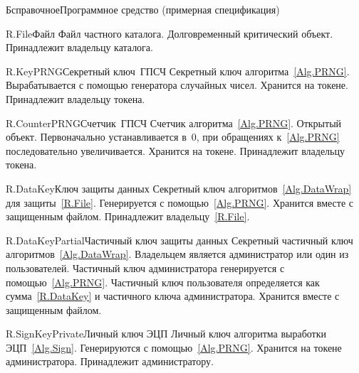 \begin{appendix}{Б}{справочное}{Программное средство \CryptoDisk 
(примерная спецификация)}
\begin{definition}{R.File}{Файл}
Файл частного каталога.
Долговременный критический объект.
Принадлежит владельцу каталога.
\end{definition}

\begin{definition}{R.KeyPRNG}{Секретный ключ~ГПСЧ}
Секретный ключ алгоритма~\ref{Alg.PRNG}.
Вырабатывается с помощью генератора случайных чисел.
Хранится на токене. Принадлежит владельцу токена.
\end{definition}

\begin{definition}{R.CounterPRNG}{Счетчик~ГПСЧ}
Счетчик алгоритма~\ref{Alg.PRNG}. Открытый объект.
Первоначально устанавливается в~$0$, при обращениях к~\ref{Alg.PRNG}
последовательно увеличивается. Хранится на токене. 
Принадлежит владельцу токена.
\end{definition}


\begin{definition}{R.DataKey}{Ключ защиты данных}
Секретный ключ алгоритмов~\ref{Alg.DataWrap} для защиты~\ref{R.File}.
Генерируется с помощью~\ref{Alg.PRNG}.
Хранится вместе с защищенным файлом. 
Принадлежит владельцу~\ref{R.File}.
\end{definition}

\begin{definition}{R.DataKeyPartial}{Частичный ключ защиты данных}
Секретный частичный ключ алгоритмов~\ref{Alg.DataWrap}.
Владельцем является администратор или один из пользователей.
Частичный ключ администратора генерируется с помощью~\ref{Alg.PRNG}.
Частичный ключ пользователя определяется как сумма~\ref{R.DataKey} 
и частичного ключа администратора. 
Хранится вместе с защищенным файлом. 
\end{definition}

\begin{definition}{R.SignKeyPrivate}{Личный ключ ЭЦП}
Личный ключ алгоритма выработки ЭЦП~\ref{Alg.Sign}.
Генерируются с помощью~\ref{Alg.PRNG}.
Хранится на токене администратора. Принадлежит администратору.
\end{definition}


\end{appendix}

